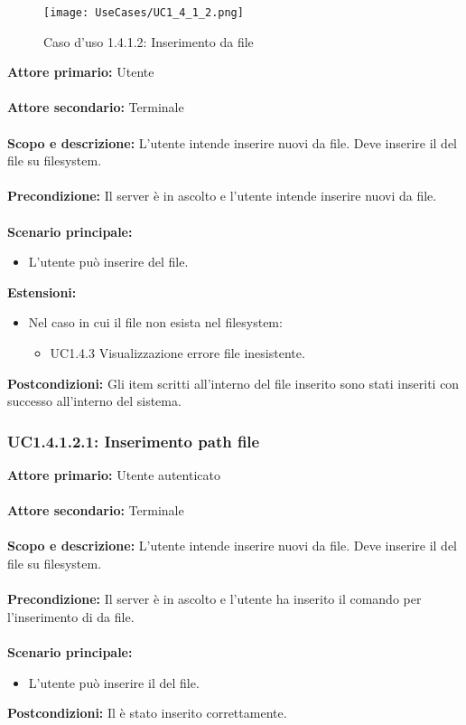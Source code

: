 \documentclass{scalatekids-article}
\begin{document}
\begin{figure}[H]
  \begin{center}
    \texttt{[image: UseCases/UC1\_4\_1\_2.png]}
    \caption*{Caso d'uso 1.4.1.2: Inserimento  da file}
  \end{center}
\end{figure}
\textbf{Attore primario:} Utente\\ \\
\textbf{Attore secondario:} Terminale\\ \\
\textbf{Scopo e descrizione:} L'utente intende inserire nuovi  da file. Deve inserire il  del file su filesystem.\\ \\
\textbf{Precondizione:} Il server è in ascolto e l'utente intende inserire nuovi  da file.\\ \\
\textbf{Scenario principale:}
\begin{itemize}
  \item L'utente può inserire  del file.
\end{itemize}
\textbf{Estensioni:}
\begin{itemize}
  \item Nel caso in cui il file non esista nel filesystem:
  \begin{itemize}
    \item UC1.4.3 Visualizzazione errore file inesistente.
  \end{itemize}
\end{itemize}
\textbf{Postcondizioni:} Gli item scritti all'interno del file inserito sono stati inseriti con successo all'interno del sistema.%

\subsubsection{UC1.4.1.2.1: Inserimento path file}

\textbf{Attore primario:} Utente autenticato\\ \\
\textbf{Attore secondario:} Terminale\\ \\
\textbf{Scopo e descrizione:} L'utente intende inserire nuovi  da file. Deve inserire il  del file su filesystem.\\ \\
\textbf{Precondizione:} Il server è in ascolto e l'utente ha inserito il comando per l'inserimento di  da file.\\ \\
\textbf{Scenario principale:}
\begin{itemize}
  \item L'utente può inserire il  del file.
\end{itemize}
\textbf{Postcondizioni:} Il  è stato inserito correttamente.
\end{document}
